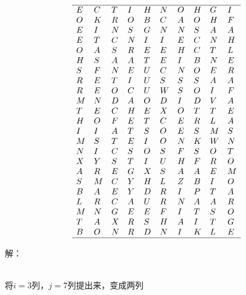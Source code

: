 \documentclass{article}
\begin{document}
$$
\begin{array}{llllllllll}
\hline
E& C& T& I& H& N& O& H& G& I\\
O& K& R& O& B& C& A& O& H& F \\
E& I& N& S& G& N& N& S& A& A   \\
E& T& C& N& I& I& E& C& N& H   \\
O& A& S& R& E& E& H& C& T& L  \\
H& S& A& A& T& E& I& B& N& E  \\
S& F& N& E& U& C& N& O& E& R   \\
R& E& T& I& U& S& S& S& A& A \\
R& E& O& C& U& W& S& O& I& F \\
M& N& D& A& O& D& I& D& V& A   \\
T& E& C& H& E& X& O& T& T& E   \\
H& O& F& E& T& C& E& R& L& A \\
I& I& A& T& S& O& E& S& M& S \\
M& S& T& E& I& O& N& K& W& N \\
N& I& C& S& O& S& F& S& O& T \\
X& Y& S& T& I& U& H& F& R& O \\
A& R& E& G& X& S& A& A& E& M \\
S& M& C& Y& H& L& Z& B& I& O\\
B& A& E& Y& D& R& I& P& T& A \\
L& R& C& A& U& R& N& A& A& R\\
M& N& G& E& E& F& I& T& S& O \\
T& A& X& R& S& H& A& I& T &G\\
B& O& N& R& D& N& I& K& L& E\\
\hline
\end{array}
$$

解：

~\\

将$i=3$列，$j=7$列提出来，变成两列
\end{document}
